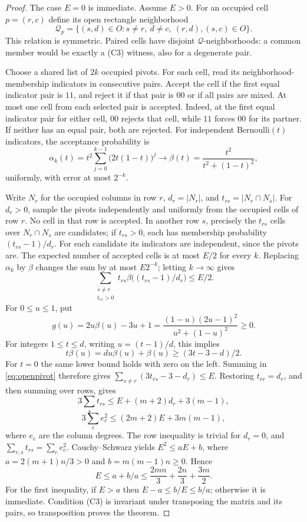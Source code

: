 \documentclass[11pt]{article}
\begin{document}
\begin{proof}
The case $E=0$ is immediate. Assume $E>0$.
For an occupied cell $p=(r,c)$ define its open rectangle neighborhood
\[
 \mathcal Q_p=\{(s,d)\in O:s\ne r,\ d\ne c,\ (r,d),(s,c)\in O\}.
\]
This relation is symmetric. Paired cells have disjoint
$\mathcal Q$-neighborhoods: a common member would be exactly a
\textup{(C3)} witness, also for a degenerate pair.

Choose a shared list of $2k$ occupied pivots. For each cell, read its
neighborhood-membership indicators in consecutive pairs. Accept the cell
if the first equal indicator pair is $11$, and reject it if that pair
is $00$ or if all pairs are mixed. At most one cell from each selected
pair is accepted. Indeed, at the first equal indicator pair for either
cell, $00$ rejects that cell, while $11$ forces $00$ for its partner.
If neither has an equal pair, both are rejected.
For independent Bernoulli$(t)$ indicators, the acceptance probability is
\[
 \alpha_k(t)=t^2\sum_{j=0}^{k-1}\bigl(2t(1-t)\bigr)^j
 \longrightarrow\beta(t)=\frac{t^2}{t^2+(1-t)^2},
\]
uniformly, with error at most $2^{-k}$.

Write $N_r$ for the occupied columns in row $r$, $d_r=|N_r|$, and
$t_{rs}=|N_r\cap N_s|$. For $d_r>0$, sample the pivots independently
and uniformly from the occupied cells of row $r$.
No cell in that row is accepted. In another row $s$, precisely the
$t_{rs}$ cells over $N_r\cap N_s$ are candidates; if $t_{rs}>0$,
each has membership probability $(t_{rs}-1)/d_r$.
For each candidate its indicators are independent, since the pivots are.
The expected number of accepted cells is at most $E/2$ for every $k$.
Replacing $\alpha_k$ by $\beta$ changes the sum by at most $E2^{-k}$;
letting $k\to\infty$ gives
\begin{equation}\label{eq:openpivot}
 \sum_{\substack{s\ne r\\t_{rs}>0}}
 t_{rs}\beta\bigl((t_{rs}-1)/d_r\bigr)\le E/2.
\end{equation}
For $0\le u\le1$, put
\begin{equation}\label{eq:scalar-slack}
 g(u)=2u\beta(u)-3u+1
 =\frac{(1-u)(2u-1)^2}{u^2+(1-u)^2}\ge0.
\end{equation}
For integers $1\le t\le d$, writing $u=(t-1)/d$, this implies
\[
 t\beta(u)=du\beta(u)+\beta(u)\ge(3t-3-d)/2.
\]
For $t=0$ the same lower bound holds with zero on the left.
Summing in \eqref{eq:openpivot} therefore gives
$\sum_{s\ne r}(3t_{rs}-3-d_r)\le E$. Restoring $t_{rr}=d_r$, and then
summing over rows, gives
\[
 3\sum_s t_{rs}\le E+(m+2)d_r+3(m-1),
\]
\begin{equation}\label{eq:degree-moment}
 3\sum_c e_c^2\le(2m+2)E+3m(m-1),
\end{equation}
where $e_c$ are the column degrees. The row inequality is trivial for
$d_r=0$, and $\sum_{r,s}t_{rs}=\sum_c e_c^2$.
Cauchy--Schwarz yields $E^2\le aE+b$, where
$a=2(m+1)n/3>0$ and $b=m(m-1)n\ge0$. Hence
\[
 E\le a+b/a\le\frac{2mn}{3}+\frac{2n}{3}+\frac{3m}{2}.
\]
For the first inequality, if $E>a$ then $E-a\le b/E\le b/a$;
otherwise it is immediate. Condition (C3) is invariant under transposing
the matrix and its pairs, so transposition proves the theorem.
\end{proof}
\end{document}
